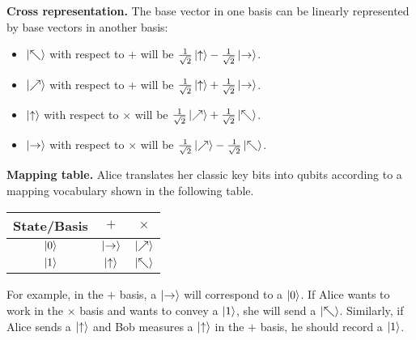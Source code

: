 \documentclass{easyclass}
\begin{document}
\textbf{Cross representation.} The base vector in one basis can be linearly represented by base vectors in another basis:
\begin{itemize}
	\item $\ket{\nwarrow}$ with respect to $+$ will be $\frac{1}{\sqrt{2}}\ket{\uparrow}-\frac{1}{\sqrt{2}}\ket{\rightarrow}$.
	
	\item $\ket{\nearrow}$ with respect to $+$ will be $\frac{1}{\sqrt{2}}\ket{\uparrow}+\frac{1}{\sqrt{2}}\ket{\rightarrow}$.
	
	\item $\ket{\uparrow}$ with respect to $\times$ will be $\frac{1}{\sqrt{2}}\ket{\nearrow}+\frac{1}{\sqrt{2}}\ket{\nwarrow}$.
	
	\item $\ket{\rightarrow}$ with respect to $\times$ will be $\frac{1}{\sqrt{2}}\ket{\nearrow}-\frac{1}{\sqrt{2}}\ket{\nwarrow}$.
\end{itemize}

\textbf{Mapping table.} Alice translates her classic key bits into qubits according to a mapping vocabulary shown in the following table.
\begin{table}[h]
	\centering
	\begin{tabular}{ccc}
		\toprule  
		State/Basis&$+$&$\times$ \\ 
		\midrule
		$\ket{0}$&$\ket{\rightarrow}$&$\ket{\nearrow}$ \\
		$\ket{1}$&$\ket{\uparrow}$&$\ket{\nwarrow}$ \\
		\bottomrule  
	\end{tabular}
\end{table}
For example, in the $+$ basis, a $\ket{\rightarrow}$ will correspond to a $\ket{0}$. If Alice wants to work in the $\times$ basis and wants to convey a $\ket{1}$, she will send a $\ket{\nwarrow}$. Similarly, if Alice sends a $\ket{\uparrow}$ and Bob measures a $\ket{\uparrow}$ in the $+$ basis, he should record a $\ket{1}$.
\end{document}

